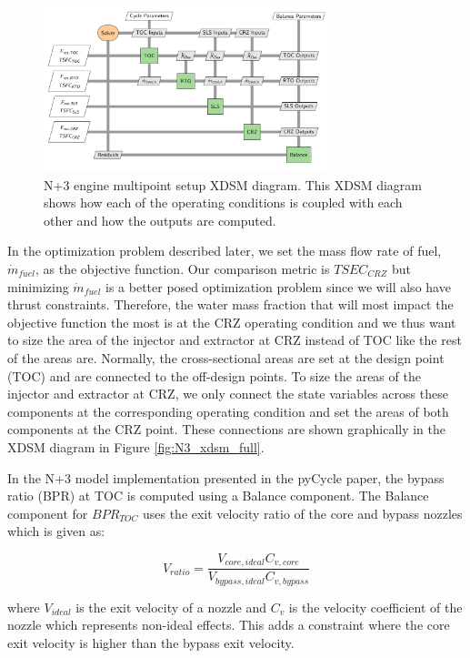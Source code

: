 \documentclass[conf]{new-aiaa}
\begin{document}
\begin{figure}[hbt!]
    \centering
    \includegraphics[width=0.75\textwidth]{N3_xdsm.pdf}
    \caption{
        N+3 engine multipoint setup XDSM diagram.
        This XDSM diagram shows how each of the operating conditions is coupled with each other and how the outputs are computed.
    }
    \label{fig:N3_xdsm}
\end{figure}

In the optimization problem described later, we set the mass flow rate of fuel, $\dot{m}_{fuel}$, as the objective function.
Our comparison metric is $TSEC_{CRZ}$ but minimizing $\dot{m}_{fuel}$ is a better posed optimization problem since we will also have thrust constraints.
Therefore, the water mass fraction that will most impact the objective function the most is at the CRZ operating condition and we thus want to size the area of the injector and extractor at CRZ instead of TOC like the rest of the areas are.
Normally, the cross-sectional areas are set at the design point (TOC) and are connected to the off-design points.
To size the areas of the injector and extractor at CRZ, we only connect the state variables across these components at the corresponding operating condition and set the areas of both components at the CRZ point.
These connections are shown graphically in the XDSM diagram in Figure \ref{fig:N3_xdsm_full}.

In the N+3 model implementation presented in the pyCycle paper, the bypass ratio (BPR) at TOC is computed using a Balance component.
The Balance component for $BPR_{TOC}$ uses the exit velocity ratio of the core and bypass nozzles which is given as:

\begin{equation}
    V_{ratio} = \frac{V_{core,ideal}C_{v,core}}{V_{bypass,ideal}C_{v,bypass}}
\end{equation}

\noindent
where $V_{ideal}$ is the exit velocity of a nozzle and $C_v$ is the velocity coefficient of the nozzle which represents non-ideal effects.
This adds a constraint where the core exit velocity is higher than the bypass exit velocity.
\end{document}

